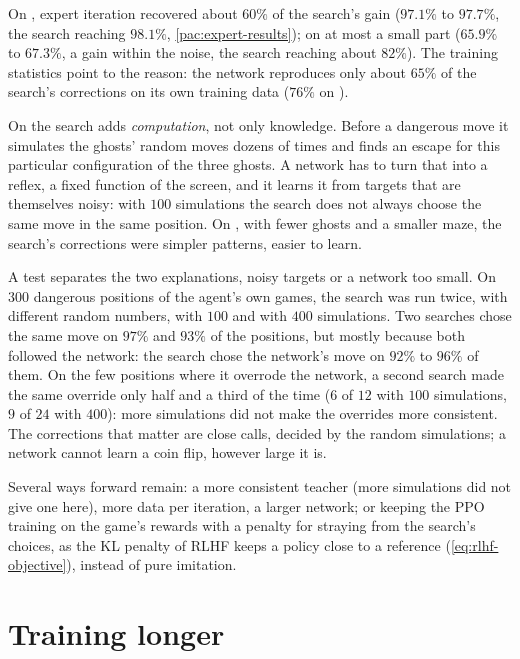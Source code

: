 On , expert iteration recovered about $60\%$ of the search's gain
($97.1\%$ to $97.7\%$, the search reaching $98.1\%$,
\cref{pac:expert-results}); on  at most a small part ($65.9\%$ to
$67.3\%$, a gain within the noise, the search reaching about $82\%$). The
training statistics point to the reason: the network reproduces only about
$65\%$ of the search's corrections on its own training data ($76\%$ on
).

\begin{intuition}
  On  the search adds \emph{computation}, not only knowledge.
  Before a dangerous move it simulates the ghosts' random moves dozens of
  times and finds an escape for this particular configuration of the
  three ghosts. A network has to turn that into a reflex, a fixed function
  of the screen, and it learns it from targets that are themselves noisy:
  with $100$ simulations the search does not always choose the same move in
  the same position. On , with fewer ghosts and a smaller maze,
  the search's corrections were simpler patterns, easier to learn.
\end{intuition}

A test separates the two explanations, noisy targets or a network too
small. On $300$ dangerous positions of the agent's own games, the search
was run twice, with different random numbers, with $100$ and with $400$
simulations. Two searches chose the same move on $97\%$ and $93\%$ of the
positions, but mostly because both followed the network: the search chose
the network's move on $92\%$ to $96\%$ of them. On the few positions where
it overrode the network, a second search made the same override only half
and a third of the time ($6$ of $12$ with $100$ simulations, $9$ of $24$
with $400$): more simulations did not make the overrides more
consistent.
The corrections that matter are close calls, decided by the random
simulations; a network cannot learn a coin flip, however large it is.

Several ways forward remain: a more consistent teacher (more simulations
did not give one here), more data per iteration, a larger network; or keeping
the PPO training on the game's rewards with a penalty for straying from the
search's
choices, as the KL penalty of RLHF keeps a policy close to a reference
(\cref{eq:rlhf-objective}), instead of pure imitation.

\section{Training longer}


